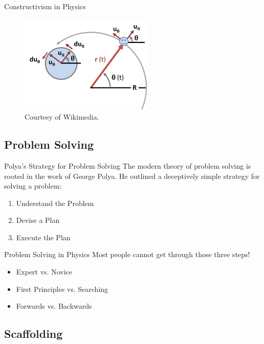 \documentclass{beamer}
\begin{document}
\begin{frame}{Constructivism in Physics}
  \begin{figure}
  \centering
    \includegraphics[width=2.5in]{img/presentation/vectors}
    \caption{Courtesy of Wikimedia.}
  \end{figure}
\end{frame}

\subsection*{Problem Solving}

\begin{frame}{Polya's Strategy for Problem Solving}
The modern theory of problem solving is rooted in the work of George Polya. He outlined a deceptively simple strategy for solving a problem:
\vspace{5mm}
\begin{enumerate}
\item Understand the Problem
\item Devise a Plan
\item Execute the Plan
\end{enumerate}
\end{frame}

\begin{frame}{Problem Solving in Physics}
Most people cannot get through those three steps!
\vspace{5mm}
\begin{itemize}
\item Expert vs. Novice
\item First Principles vs. Searching
\item Forwards vs. Backwards
\end{itemize}
\end{frame}

\subsection*{Scaffolding}
\end{document}
